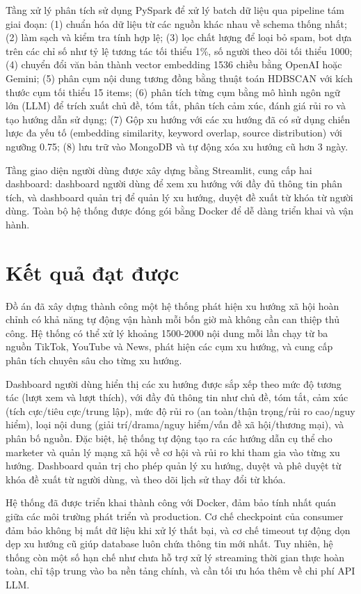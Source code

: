 Tầng xử lý phân tích sử dụng PySpark để xử lý batch dữ liệu qua pipeline tám giai đoạn: (1) chuẩn hóa dữ liệu từ các nguồn khác nhau về schema thống nhất; (2) làm sạch và kiểm tra tính hợp lệ; (3) lọc chất lượng để loại bỏ spam, bot dựa trên các chỉ số như tỷ lệ tương tác tối thiểu 1\%, số người theo dõi tối thiểu 1000; (4) chuyển đổi văn bản thành vector embedding 1536 chiều bằng OpenAI hoặc Gemini; (5) phân cụm nội dung tương đồng bằng thuật toán HDBSCAN với kích thước cụm tối thiểu 15 items; (6) phân tích từng cụm bằng mô hình ngôn ngữ lớn (LLM) để trích xuất chủ đề, tóm tắt, phân tích cảm xúc, đánh giá rủi ro và tạo hướng dẫn sử dụng; (7) Gộp xu hướng với các xu hướng đã có sử dụng chiến lược đa yếu tố (embedding similarity, keyword overlap, source distribution) với ngưỡng 0.75; (8) lưu trữ vào MongoDB và tự động xóa xu hướng cũ hơn 3 ngày.

Tầng giao diện người dùng được xây dựng bằng Streamlit, cung cấp hai dashboard: dashboard người dùng để xem xu hướng với đầy đủ thông tin phân tích, và dashboard quản trị để quản lý xu hướng, duyệt đề xuất từ khóa từ người dùng. Toàn bộ hệ thống được đóng gói bằng Docker để dễ dàng triển khai và vận hành.

\section*{Kết quả đạt được}

Đồ án đã xây dựng thành công một hệ thống phát hiện xu hướng xã hội hoàn chỉnh có khả năng tự động vận hành mỗi bốn giờ mà không cần can thiệp thủ công. Hệ thống có thể xử lý khoảng 1500-2000 nội dung mỗi lần chạy từ ba nguồn TikTok, YouTube và News, phát hiện các cụm xu hướng, và cung cấp phân tích chuyên sâu cho từng xu hướng.

Dashboard người dùng hiển thị các xu hướng được sắp xếp theo mức độ tương tác (lượt xem và lượt thích), với đầy đủ thông tin như chủ đề, tóm tắt, cảm xúc (tích cực/tiêu cực/trung lập), mức độ rủi ro (an toàn/thận trọng/rủi ro cao/nguy hiểm), loại nội dung (giải trí/drama/nguy hiểm/vấn đề xã hội/thương mại), và phân bố nguồn. Đặc biệt, hệ thống tự động tạo ra các hướng dẫn cụ thể cho marketer và quản lý mạng xã hội về cơ hội và rủi ro khi tham gia vào từng xu hướng. Dashboard quản trị cho phép quản lý xu hướng, duyệt và phê duyệt từ khóa đề xuất từ người dùng, và theo dõi lịch sử thay đổi từ khóa.

Hệ thống đã được triển khai thành công với Docker, đảm bảo tính nhất quán giữa các môi trường phát triển và production. Cơ chế checkpoint của consumer đảm bảo không bị mất dữ liệu khi xử lý thất bại, và cơ chế timeout tự động dọn dẹp xu hướng cũ giúp database luôn chứa thông tin mới nhất. Tuy nhiên, hệ thống còn một số hạn chế như chưa hỗ trợ xử lý streaming thời gian thực hoàn toàn, chỉ tập trung vào ba nền tảng chính, và cần tối ưu hóa thêm về chi phí API LLM.

